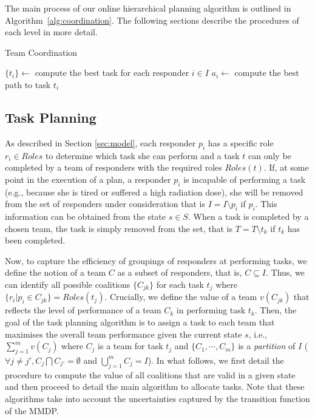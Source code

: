 The main process of our online hierarchical planning algorithm is
outlined in Algorithm~\ref{alg:coordination}. The following
sections describe the procedures of each level in more detail.

\begin{algorithm}[t]
  \caption{Team Coordination}\small
  \label{alg:coordination}
  \Indm
  \Indp\BlankLine
  $\{ t_i \} \gets$ compute the best task for each responder $i\in I$ \;
   {
    $a_i \gets$ compute the best path to task $t_i$ \;
  }
  \vspace{-1mm}

\end{algorithm}

\subsection{Task Planning}
\label{sec:taskplanning}

\noindent As described in Section \ref{sec:model}, each responder
$p_i$ has a specific role $r_i \in Roles$ to determine which task
she can perform and  a task $t$ can only be completed by a team of
responders with the required roles $Roles(t)$. If, at some point in
the execution of a plan, a responder $p_i$ is incapable of
performing a task (e.g., because she is tired or suffered a high
radiation dose), she will be removed from the set of responders
under consideration that is $I = I \setminus p_i$ if $p_i$. This
information can be obtained from the state $s \in S$. When a task
is completed by a chosen team, the task is simply removed from the
set, that is $T = T\setminus t_k$ if $t_k$ has been completed.

Now, to capture the efficiency of groupings of responders at
performing tasks, we define the notion of a team $C$ as a subset of
responders, that is, $C \subseteq I$. Thus, we can identify all
possible coalitions $\{ C_{jk} \}$ for each task $t_j$ where $\{r_i
| p_i \in C_{jk}\} = Roles(t_j)$. Crucially, we define the value of
a team $v(C_{jk})$ that reflects the level of performance of a team
$C_k$ in performing task $t_k$.  Then, the goal of the task
planning algorithm is to assign a task to each team that maximises
the overall team performance given the current state $s$, i.e.,
$\sum_{j=1}^m v(C_j)$ where $C_j$ is a team for task $t_j$ and $\{
C_1, \cdots, C_m \}$ is a {\em partition} of $I$ ($\forall j\neq
j', C_j \bigcap C_{j'} = \emptyset$ and $\bigcup_{j=1}^m C_j=I$).
In what follows, we first detail the procedure to compute the value
of all coalitions that are valid in a given state and then proceed
to detail the main algorithm to allocate tasks. Note that these
algorithms take into account the uncertainties captured by the
transition function of the MMDP.


